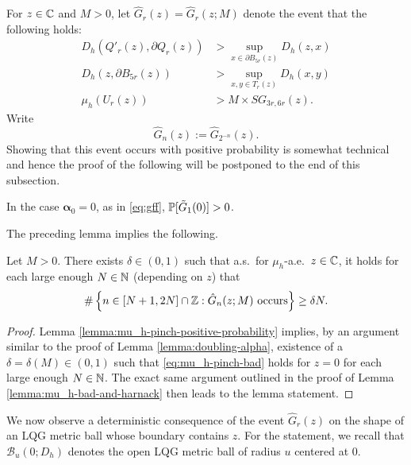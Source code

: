 \documentclass[12pt]{amsart}
\numberwithin{equation}{section}
\newcommand{\SGrho}[2]{\hyperref[eq:alternate-size-2]{SG_{#1}(#2)}}
\begin{document}
	For $z\in\C$ and $M>0$, let $\hat G_r(z) = \hat G_r(z; M) $ denote the event that the following holds:
	\begin{equation}\label{eq:pinch-point-event}
	\begin{aligned}
	D_h(Q'_r(z), \partial Q_r(z)) &> \sup_{x \in \partial B_{5 r}(z)} D_h(z, x) \\
	D_h(z, \partial B_{5 r}(z)) &>  \sup_{x, y \in T_r(z)} D_h(x, y) \\
	\mu_h(U_r(z)) &> M \times \SGrho{3r,6r}{z} .
	\end{aligned}
	\end{equation}
	Write 
	\[
	\hat G_n(z) := \hat G_{2^{-n}}(z) .
	\]
	Showing that this event occurs with positive probability is somewhat technical and hence the proof of the following will be postponed to the end of this subsection.  
	\begin{lemma} \label{lemma:mu_h-pinch-positive-probability}
		In the case $\boldsymbol{\alpha}_0 = 0$, as in \eqref{eq:gff}, $\P[\tilde G_1(0)] > 0$. 
	\end{lemma}
	The preceding lemma implies the following. 
	
	
	
	
	\begin{lemma} \label{lemma:mu_h-pinch-bad}
		Let $M > 0$. There exists $\delta \in (0,1)$ such that a.s.\ for $\mu_h$-a.e.\ $z\in  \C$, it holds for each large enough $N\in \N$ (depending on $z$) that
		\begin{equation} \label{eq:mu_h-pinch-bad}
		\#\left\{ n \in [N+1,2N]\cap \Z  : \mbox{$\hat G_n(z; M)$ occurs} \right\}  \geq \delta N.
		\end{equation}  
	\end{lemma}
	\begin{proof}
		Lemma \ref{lemma:mu_h-pinch-positive-probability} implies, by an argument similar to the proof of Lemma \ref{lemma:doubling-alpha},
		existence of a $\delta = \delta(M) \in (0,1)$ such that \eqref{eq:mu_h-pinch-bad} holds for $z = 0$ for each large enough $N\in \N$.
		The exact same argument outlined in the proof of Lemma \ref{lemma:mu_h-bad-and-harnack} then leads to the lemma statement. 
	\end{proof}
	
	
	We now observe a deterministic consequence of the event $\hat G_r(z)$ on the shape of an LQG metric ball whose boundary contains $z$. For the statement, we recall that $\mathcal B_u(0;D_h)$ denotes the open LQG metric ball of radius $u$ centered at 0.
	
\end{document}

